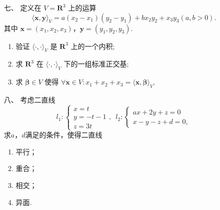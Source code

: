 \begin{enumerate}
    \item[七、]定义在 $ V = \mathbf{R}^3 $ 上的运算
    \[ \langle \boldsymbol{x}, \boldsymbol{y} \rangle_V = a(x_2-x_1)(y_2-y_1)+bx_2y_2+x_3y_3(a,b>0). \]
    其中 $ \boldsymbol{x} = (x_1, x_2, x_3) $，$ \boldsymbol{y} = (y_1, y_2, y_3) $.
    \begin{enumerate}[label=(\arabic*)]
        \item 验证 $ \langle \cdot, \cdot \rangle_V $ 是 $ \mathbf{R}^3 $ 上的一个内积;

        \item 求 $ \mathbf{R}^3 $ 在 $ \langle \cdot, \cdot \rangle_V $ 下的一组标准正交基;

        \item 求 $ \boldsymbol{\beta} \in V $ 使得 $ \forall \boldsymbol{x} \in V: x_1 + x_2 + x_3 = \langle \boldsymbol{x}, \boldsymbol{\beta} \rangle_V $.
    \end{enumerate}

\item[八、]考虑二直线
    \[l_1:\begin{cases}
        x=t \\ y=-t-1 \\ z=3t
    \end{cases},\enspace l_2:\begin{cases}
        ax+2y+z=0 \\ x-y-z+d=0,
    \end{cases}\]
    求$a$，$d$满足的条件，使得二直线
    \begin{enumerate}[label=(\arabic*)]
        \item 平行；

        \item 重合；

        \item 相交；

        \item 异面.
    \end{enumerate}
\end{enumerate}


\clearpage
